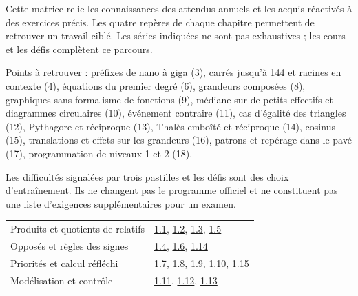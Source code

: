 \clearpage{}\label{couverture-programme}\gdef\otChapNum{0}\pagestyle{otFront}
Cette matrice relie les connaissances des attendus annuels et les acquis
réactivés à des exercices précis. Les quatre repères de chaque chapitre
permettent de retrouver un travail ciblé. Les séries indiquées ne sont pas
exhaustives ; les cours et les défis complètent ce parcours.\par\bigskip
Points à retrouver : préfixes de nano à giga (3), carrés jusqu’à 144 et
racines en contexte (4), équations du premier degré (6), grandeurs composées
(8), graphiques sans formalisme de fonctions (9), médiane sur de petits
effectifs et diagrammes circulaires (10), événement contraire (11),
cas d’égalité des triangles (12), Pythagore et réciproque (13),
Thalès emboîté et réciproque (14), cosinus (15), translations et effets
sur les grandeurs (16), patrons et repérage dans le pavé (17),
programmation de niveaux 1 et 2 (18).\par\bigskip
\begin{attention}Les difficultés signalées par trois pastilles et les défis sont des choix d’entraînement. Ils ne changent pas le programme officiel et ne constituent pas une liste d’exigences supplémentaires pour un examen.\end{attention}
\clearpage
{}\fontsize{10}{13}\selectfont
{}\begin{tabularx}{\linewidth}{@{}Yl@{}}\toprule
Produits et quotients de relatifs & \hyperref[exo-1-1]{1.1}, \hyperref[exo-1-2]{1.2}, \hyperref[exo-1-3]{1.3}, \hyperref[exo-1-5]{1.5}\\[2mm]
Opposés et règles des signes & \hyperref[exo-1-4]{1.4}, \hyperref[exo-1-6]{1.6}, \hyperref[exo-1-14]{1.14}\\[2mm]
Priorités et calcul réfléchi & \hyperref[exo-1-7]{1.7}, \hyperref[exo-1-8]{1.8}, \hyperref[exo-1-9]{1.9}, \hyperref[exo-1-10]{1.10}, \hyperref[exo-1-15]{1.15}\\[2mm]
Modélisation et contrôle & \hyperref[exo-1-11]{1.11}, \hyperref[exo-1-12]{1.12}, \hyperref[exo-1-13]{1.13}\\[2mm]
\bottomrule\end{tabularx}\par\vspace{4mm}
